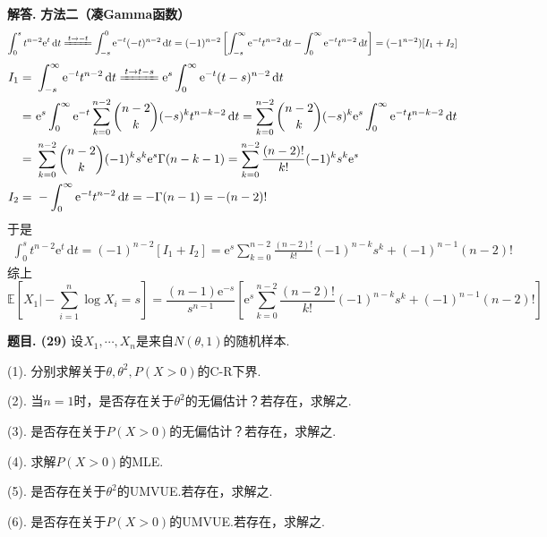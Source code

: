 \documentclass[12pt, a4paper, oneside]{ctexart}
\newcounter{problem}  %
\newenvironment{problem}[1][]{\stepcounter{problem}\par\noindent\textbf{题目\arabic{problem}. #1}}{\smallskip\par}
\newenvironment{solution}[1][]{\par\noindent\textbf{#1解答. }}{\smallskip\par}  %
\def\E{\mathbb{E}}          %
\def\d{\mathrm{d}}          %
\def\e{\mathrm{e}}          %
\def\add{\vspace{1ex}}      %
\begin{document}
\begin{solution}
    \textbf{方法二（凑Gamma函数）}
    \begin{align*}
        \int_0^st^{n-2}\e^t\,\d t \xlongequal{t\to-t} \int_{-s}^0\e^{-t}(-t)^{n-2}\,\d t = (-1)^{n-2}\left[\int_{-s}^\infty\e^{-t}t^{n-2}\,\d t-\int_0^\infty\e^{-t}t^{n-2}\,\d t\right] = (-1^{n-2})[I_1+I_2]
    \end{align*}
    \begin{align*}
        I_1 =&\ \int_{-s}^\infty\e^{-t}t^{n-2}\,\d t\xlongequal{t\to t-s}\e^s\int_0^\infty \e^{-t}(t-s)^{n-2}\,\d t\\
        =&\ \e^s\int_0^\infty \e^{-t}\sum_{k=0}^{n-2}\binom{n-2}{k}(-s)^kt^{n-k-2}\,\d t = \sum_{k=0}^{n-2}\binom{n-2}{k}(-s)^k\e^{s}\int_0^\infty\e^{-t}t^{n-k-2}\,\d t\\
        =&\ \sum_{k=0}^{n-2}\binom{n-2}{k}(-1)^ks^k\e^s\Gamma(n-k-1) = \sum_{k=0}^{n-2}\frac{(n-2)!}{k!}(-1)^ks^k\e^s\\
        I_2 =&\ -\int_0^\infty\e^{-t}t^{n-2}\,\d t = -\Gamma(n-1) = -(n-2)!
    \end{align*}
    于是
    \begin{align*}
        \int_0^st^{n-2}\e^t\,\d t = (-1)^{n-2}[I_1+I_2] = \e^{s}\sum_{k=0}^{n-2}\frac{(n-2)!}{k!}(-1)^{n-k}s^k+(-1)^{n-1}(n-2)!
    \end{align*}
    综上
    \begin{equation*}
        \E\left[X_1\biggl|-\sum_{i=1}^n\log X_i=s\right] = \frac{(n-1)\e^{-s}}{s^{n-1}}\left[
        \e^{s}\sum_{k=0}^{n-2}\frac{(n-2)!}{k!}(-1)^{n-k}s^k+(-1)^{n-1}(n-2)!
        \right]
    \end{equation*}
\end{solution}
\begin{problem}[(29)]
    设$X_1,\cdots,X_n$是来自$N(\theta,1)$的随机样本.

    (1). 分别求解关于$\theta, \theta^2, P(X>0)$的C-R下界.

    (2). 当$n=1$时，是否存在关于$\theta^2$的无偏估计？若存在，求解之.

    (3). 是否存在关于$P(X>0)$的无偏估计？若存在，求解之.

    (4). 求解$P(X>0)$的MLE.

    (5). 是否存在关于$\theta^2$的UMVUE.若存在，求解之.

    (6). 是否存在关于$P(X>0)$的UMVUE.若存在，求解之.\add
\end{problem}
\end{document}
